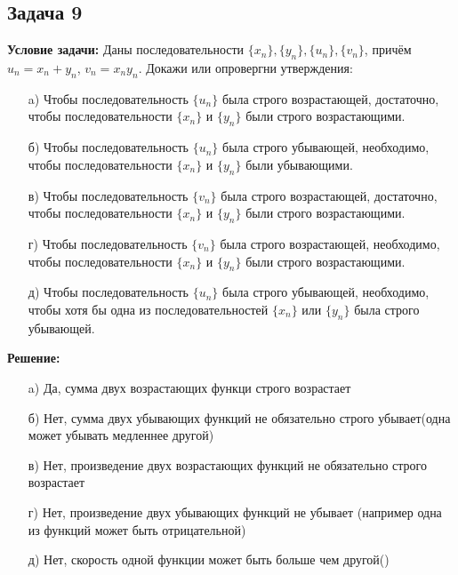 \documentclass[a4paper,12pt]{article}
\begin{document}
\subsection{Задача 9}
\textbf{Условие задачи:}
Даны последовательности \(\{x_n\}, \{y_n\}, \{u_n\}, \{v_n\}\), причём \(u_n = x_n + y_n\), \(v_n = x_n y_n\). Докажи или опровергни утверждения:
\begin{itemize}
    \item[a)] Чтобы последовательность \( \{u_n\} \) была строго возрастающей, достаточно, чтобы последовательности \(\{x_n\}\) и \(\{y_n\}\) были строго возрастающими.
    \item[б)] Чтобы последовательность \( \{u_n\} \) была строго убывающей, необходимо, чтобы последовательности \(\{x_n\}\) и \(\{y_n\}\) были убывающими.
    \item[в)] Чтобы последовательность \( \{v_n\} \) была строго возрастающей, достаточно, чтобы последовательности \(\{x_n\}\) и \(\{y_n\}\) были строго возрастающими.
    \item[г)] Чтобы последовательность \( \{v_n\} \) была строго возрастающей, необходимо, чтобы последовательности \(\{x_n\}\) и \(\{y_n\}\) были строго возрастающими.
    \item[д)] Чтобы последовательность \( \{u_n\} \) была строго убывающей, необходимо, чтобы хотя бы одна из последовательностей \(\{x_n\}\) или \(\{y_n\}\) была строго убывающей.
\end{itemize}
\textbf{Решение: }
\begin{itemize}
    \item[a) ] Да, сумма двух возрастающих функци строго возрастает
    \item[б) ] Нет, сумма двух убывающих функций не обязательно строго убывает(одна может убывать медленнее другой)
    \item[в) ] Нет, произведение двух возрастающих функций не обязательно строго возрастает
    \item[г) ] Нет, произведение двух убывающих функций не убывает (например одна из функций может быть отрицательной)
    \item[д) ] Нет, скорость одной функции может быть больше чем другой()
\end{itemize}
\vspace{1cm}
\end{document}
